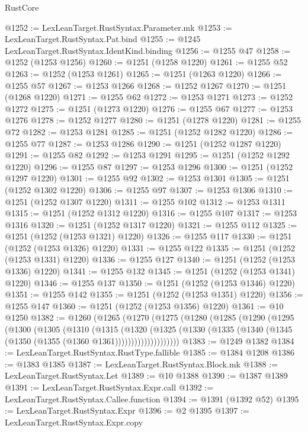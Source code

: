 \begin{lexlean}{RustCore}
\begin{coremodule}
@1252 := LexLeanTarget.RustSyntax.Parameter.mk
@1253 := LexLeanTarget.RustSyntax.Pat.bind
@1255 := @1245 LexLeanTarget.RustSyntax.IdentKind.binding
@1256 := @1255 @47
@1258 := @1252 (@1253 @1256)
@1260 := @1251 (@1258 @1220)
@1261 := @1255 @52
@1263 := @1252 (@1253 @1261)
@1265 := @1251 (@1263 @1220)
@1266 := @1255 @57
@1267 := @1253 @1266
@1268 := @1252 @1267
@1270 := @1251 (@1268 @1220)
@1271 := @1255 @62
@1272 := @1253 @1271
@1273 := @1252 @1272
@1275 := @1251 (@1273 @1220)
@1276 := @1255 @67
@1277 := @1253 @1276
@1278 := @1252 @1277
@1280 := @1251 (@1278 @1220)
@1281 := @1255 @72
@1282 := @1253 @1281
@1285 := @1251 (@1252 @1282 @1220)
@1286 := @1255 @77
@1287 := @1253 @1286
@1290 := @1251 (@1252 @1287 @1220)
@1291 := @1255 @82
@1292 := @1253 @1291
@1295 := @1251 (@1252 @1292 @1220)
@1296 := @1255 @87
@1297 := @1253 @1296
@1300 := @1251 (@1252 @1297 @1220)
@1301 := @1255 @92
@1302 := @1253 @1301
@1305 := @1251 (@1252 @1302 @1220)
@1306 := @1255 @97
@1307 := @1253 @1306
@1310 := @1251 (@1252 @1307 @1220)
@1311 := @1255 @102
@1312 := @1253 @1311
@1315 := @1251 (@1252 @1312 @1220)
@1316 := @1255 @107
@1317 := @1253 @1316
@1320 := @1251 (@1252 @1317 @1220)
@1321 := @1255 @112
@1325 := @1251 (@1252 (@1253 @1321) @1220)
@1326 := @1255 @117
@1330 := @1251 (@1252 (@1253 @1326) @1220)
@1331 := @1255 @122
@1335 := @1251 (@1252 (@1253 @1331) @1220)
@1336 := @1255 @127
@1340 := @1251 (@1252 (@1253 @1336) @1220)
@1341 := @1255 @132
@1345 := @1251 (@1252 (@1253 @1341) @1220)
@1346 := @1255 @137
@1350 := @1251 (@1252 (@1253 @1346) @1220)
@1351 := @1255 @142
@1355 := @1251 (@1252 (@1253 @1351) @1220)
@1356 := @1255 @147
@1360 := @1251 (@1252 (@1253 @1356) @1220)
@1361 := @10 @1250
@1382 := @1260
    (@1265
      (@1270
        (@1275
          (@1280
            (@1285
              (@1290
                (@1295
                  (@1300
                    (@1305
                      (@1310
                        (@1315
                          (@1320
                            (@1325
                              (@1330
                                (@1335 (@1340 (@1345 (@1350 (@1355 (@1360 @1361))))))))))))))))))))
@1383 := @1249 @1382
@1384 := LexLeanTarget.RustSyntax.RustType.fallible
@1385 := @1384 @1208
@1386 := @1383 @1385
@1387 := LexLeanTarget.RustSyntax.Block.mk
@1388 := LexLeanTarget.RustSyntax.Let
@1389 := @10 @1388
@1390 := @1387 @1389
@1391 := LexLeanTarget.RustSyntax.Expr.call
@1392 := LexLeanTarget.RustSyntax.Callee.function
@1394 := @1391 (@1392 @52)
@1395 := LexLeanTarget.RustSyntax.Expr
@1396 := @2 @1395
@1397 := LexLeanTarget.RustSyntax.Expr.copy

\end{coremodule}
\end{lexlean}
